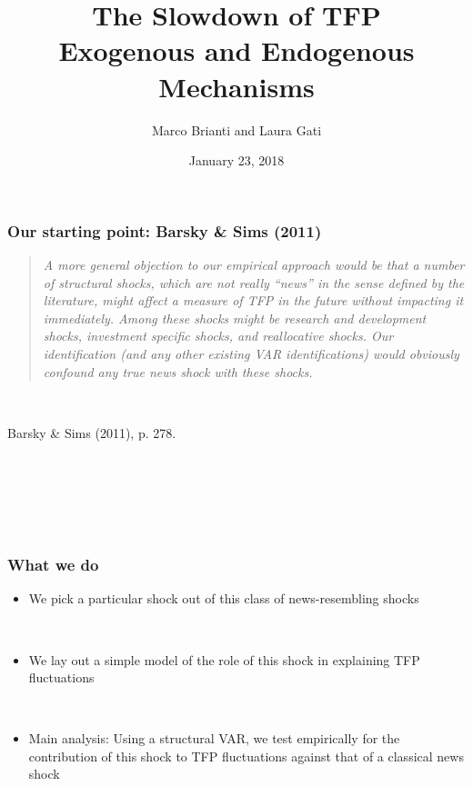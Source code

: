 \documentclass{beamer}
\author[Brianti, Gati]{Marco Brianti and Laura Gati}
\institute[Boston College]{Boston College}
\title{The Slowdown of TFP \\ Exogenous and Endogenous Mechanisms}
\date{January 23, 2018}
\begin{document}
\begin{frame}

\maketitle


\end{frame}




\begin{frame}
	\frametitle{Our starting point: Barsky \& Sims (2011)}
	\label{BS_quote}
	
\blockquote{\emph{A more general objection to our empirical approach would be that a number of structural shocks, which are not really ``news'' in the sense defined by the literature, might affect a measure of TFP in the future without impacting it immediately. Among these shocks might be research and development shocks, investment specific shocks, and reallocative shocks. Our identification (and any other existing VAR identifications) would obviously confound any true news shock with these shocks.}}

\

\hspace{5cm} Barsky \& Sims (2011), p. 278.

\

\

\
	
\hyperlink{related_lit}{}	
\hyperlink{BS_FEV}{}	
\end{frame}

\begin{frame}
	\frametitle{What we do}

\begin{itemize}
\item We pick a particular shock out of this class of news-resembling shocks

\

\item We lay out a simple model of the role of this shock in explaining TFP fluctuations

\

\item Main analysis: Using a structural VAR, we test empirically for the contribution of this shock to TFP fluctuations against that of a classical news shock
\end{itemize}

\end{frame}
\end{document}
